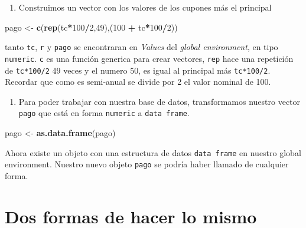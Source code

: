 \documentclass[12pt,]{book}
\newenvironment{Shaded}{\begin{snugshade}}{\end{snugshade}}
\newcommand{\KeywordTok}[1]{\textcolor[rgb]{0.13,0.29,0.53}{\textbf{#1}}}
\newcommand{\DecValTok}[1]{\textcolor[rgb]{0.00,0.00,0.81}{#1}}
\newcommand{\StringTok}[1]{\textcolor[rgb]{0.31,0.60,0.02}{#1}}
\newcommand{\OperatorTok}[1]{\textcolor[rgb]{0.81,0.36,0.00}{\textbf{#1}}}
\newcommand{\NormalTok}[1]{#1}
\providecommand{\tightlist}{%
  \setlength{\itemsep}{0pt}\setlength{\parskip}{0pt}}
\begin{document}
\begin{enumerate}
\def\labelenumi{\arabic{enumi}.}
\setcounter{enumi}{1}
\tightlist
\item
  Construimos un vector con los valores de los cupones más el principal
\end{enumerate}

\begin{Shaded}
\begin{Highlighting}[]
\NormalTok{pago <-}\StringTok{ }\KeywordTok{c}\NormalTok{(}\KeywordTok{rep}\NormalTok{(tc}\OperatorTok{*}\DecValTok{100}\OperatorTok{/}\DecValTok{2}\NormalTok{,}\DecValTok{49}\NormalTok{),(}\DecValTok{100} \OperatorTok{+}\StringTok{ }\NormalTok{tc}\OperatorTok{*}\DecValTok{100}\OperatorTok{/}\DecValTok{2}\NormalTok{))}
\end{Highlighting}
\end{Shaded}

tanto \texttt{tc}, \texttt{r} y \texttt{pago} se encontraran en
\emph{Values} del \emph{global environment}, en tipo \texttt{numeric}.
\texttt{c} es una función generica para crear vectores, \texttt{rep}
hace una repetición de \texttt{tc*100/2} 49 veces y el numero 50, es
igual al principal más \texttt{tc*100/2}. Recordar que como es
semi-anual se divide por 2 el valor nominal de 100.

\begin{enumerate}
\def\labelenumi{\arabic{enumi}.}
\setcounter{enumi}{2}
\tightlist
\item
  Para poder trabajar con nuestra base de datos, transformamos nuestro
  vector \texttt{pago} que está en forma \texttt{numeric} a
  \texttt{data\ frame}.
\end{enumerate}

\begin{Shaded}
\begin{Highlighting}[]
\NormalTok{pago <-}\StringTok{ }\KeywordTok{as.data.frame}\NormalTok{(pago)}
\end{Highlighting}
\end{Shaded}

Ahora existe un objeto con una estructura de datos \texttt{data\ frame}
en nuestro global environment. Nuestro nuevo objeto \texttt{pago} se
podría haber llamado de cualquier forma.

\section{Dos formas de hacer lo
mismo}\label{dos-formas-de-hacer-lo-mismo}
\end{document}
